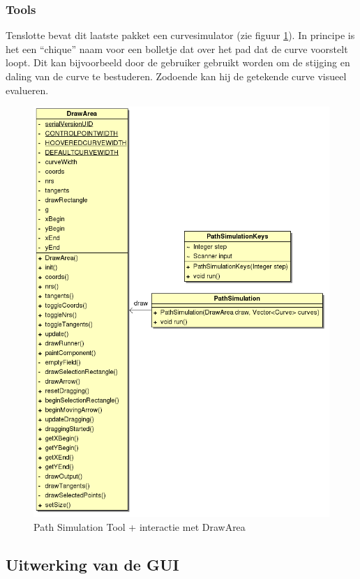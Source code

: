 \documentclass[a4paper,11pt,oneside, titlepage]{article}
\begin{document}
\subsubsection{Tools}
Tenslotte bevat dit laatste pakket een curvesimulator (zie figuur \ref{iTools}). In principe is het een ``chique'' naam voor een bolletje
dat over het pad dat de curve voorstelt loopt. Dit kan bijvoorbeeld door de gebruiker gebruikt worden om de stijging en daling
van de curve te bestuderen. Zodoende kan hij de getekende curve visueel evalueren.
\begin{figure}[htbp]
\centering
\includegraphics[scale=0.4]{./UML2/Path.png}
\caption{Path Simulation Tool + interactie met DrawArea}\label{iTools}
\end{figure}\newpage
\subsection{Uitwerking van de GUI}
\end{document}
